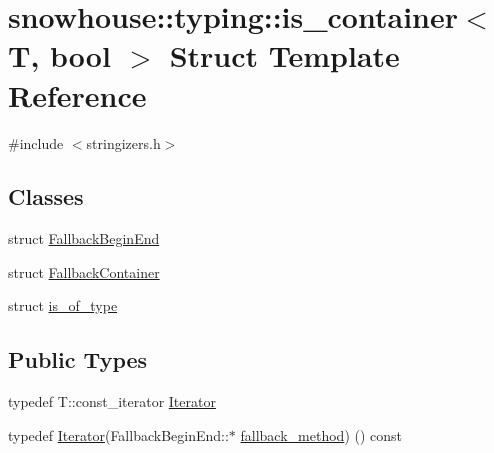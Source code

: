 \hypertarget{structsnowhouse_1_1typing_1_1is__container}{}\section{snowhouse\+::typing\+::is\+\_\+container$<$ T, bool $>$ Struct Template Reference}
\label{structsnowhouse_1_1typing_1_1is__container}


{\ttfamily \#include $<$stringizers.\+h$>$}

\subsection*{Classes}
\begin{DoxyCompactItemize}
\item 
struct \mbox{\hyperlink{structsnowhouse_1_1typing_1_1is__container_1_1FallbackBeginEnd}{Fallback\+Begin\+End}}
\item 
struct \mbox{\hyperlink{structsnowhouse_1_1typing_1_1is__container_1_1FallbackContainer}{Fallback\+Container}}
\item 
struct \mbox{\hyperlink{structsnowhouse_1_1typing_1_1is__container_1_1is__of__type}{is\+\_\+of\+\_\+type}}
\end{DoxyCompactItemize}
\subsection*{Public Types}
\begin{DoxyCompactItemize}
\item 
typedef T\+::const\+\_\+iterator \mbox{\hyperlink{structsnowhouse_1_1typing_1_1is__container_ac43487bbcd55fc7a2e4a2be11d4ae94c}{Iterator}}
\item 
typedef \mbox{\hyperlink{structsnowhouse_1_1typing_1_1is__container_ac43487bbcd55fc7a2e4a2be11d4ae94c}{Iterator}}(Fallback\+Begin\+End\+::$\ast$ \mbox{\hyperlink{structsnowhouse_1_1typing_1_1is__container_a483fd82ca18826d91df5ecf9b0635f19}{fallback\+\_\+method}}) () const
\end{DoxyCompactItemize}
